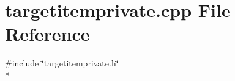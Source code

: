\section{targetitemprivate.\+cpp File Reference}
\label{bk3_2items_2targetitemprivate_8cpp}
{\ttfamily \#include \char`\"{}targetitemprivate.\+h\char`\"{}}\\*
